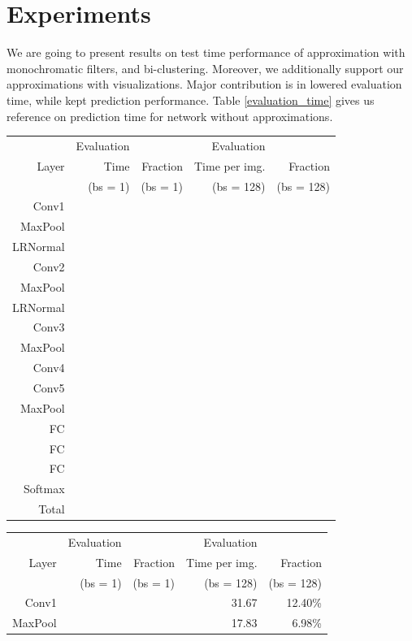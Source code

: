 \section{Experiments}

We are going to present results on test time performance of approximation with monochromatic filters, and bi-clustering. Moreover,
we additionally support our approximations with visualizations. Major contribution is in lowered evaluation time, while kept prediction performance.
Table \ref{evaluation_time} gives us reference on prediction time for network without approximations.

\begin{table}[t]
\tiny
\parbox{.99\linewidth}{
\centering
\begin{tabular}{rrrrr}
\hline
& Evaluation & & Evaluation &  \\
Layer & Time & Fraction & Time per img. & Fraction \\
& (bs = 1) & (bs = 1) & (bs = 128) & (bs = 128) \\
\hline
Conv1 & & & & \\
MaxPool & & & & \\
LRNormal & & & & \\
Conv2 & & & & \\
MaxPool & & & & \\
LRNormal & & & & \\
Conv3 & & & & \\
MaxPool & & & & \\
Conv4 & & & & \\
Conv5 & & & & \\
MaxPool & & & & \\
FC & & & & \\
FC & & & & \\
FC & & & & \\
Softmax & & & & \\
\hline 
Total & & & & \\
\hline
\end{tabular}
\vspace{5mm}
}
\parbox{.99\linewidth}{
\centering
\begin{tabular}{rrrrr}
\hline
& Evaluation & & Evaluation &  \\
Layer & Time & Fraction & Time per img. & Fraction \\
& (bs = 1) & (bs = 1) & (bs = 128) & (bs = 128) \\
\hline
Conv1 & & & 31.67 & 12.40\% \\
MaxPool & & & 17.83 & 6.98\% \\

\end{tabular}}
\end{table}
